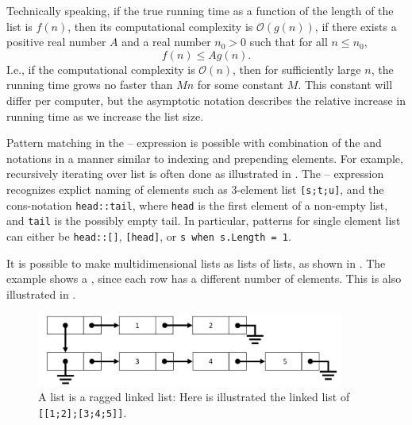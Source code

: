 \documentclass[fsharpNotes.tex]{subfiles}
\begin{document}
Technically speaking, if the true running time as a function of the length of the list is $f(n)$, then its computational complexity is $\mathcal{O}(g(n))$, if there exists a positive real number $A$ and a real number $n_0>0$ such that for all $n\leq n_0$,
\begin{equation}
  f(n) \leq Ag(n).
\end{equation}
I.e., if the computational complexity is $\mathcal{O}(n)$, then for sufficiently large $n$, the running time grows no faster than $Mn$ for some constant $M$. This constant will differ per computer, but the asymptotic notation describes the relative increase in running time as we increase the list size.

Pattern matching in the -- expression is possible with combination of the \lexeme{[]} and \lexeme{::} notations in a manner similar to indexing and prepending elements. For example, recursively iterating over list is often done as illustrated in .
%
%
The -- expression recognizes explict naming of elements such as 3-element list \lstinline{[s;t;u]}, and the cons-notation \lstinline{head::tail}, where \lstinline{head} is the first element of a non-empty list, and \lstinline{tail} is the possibly empty tail. In particular, patterns for single element list can either be \lstinline{head::[]}, \lstinline{[head]}, or \lstinline{s when s.Length = 1}.

It is possible to make multidimensional lists as lists of lists, as shown in . 
%
%
The example shows a , since each row has a different number of elements. This is also illustrated in .
\begin{figure}
  \centering
  \includegraphics[width=0.9\textwidth]{raggedLinkedList}
  \caption{A list is a ragged linked list: Here is illustrated the linked list of \mbox{\lstinline![[1;2];[3;4;5]]!}.}
  \label{fig:raggedLinkedList}
\end{figure}
\end{document}

